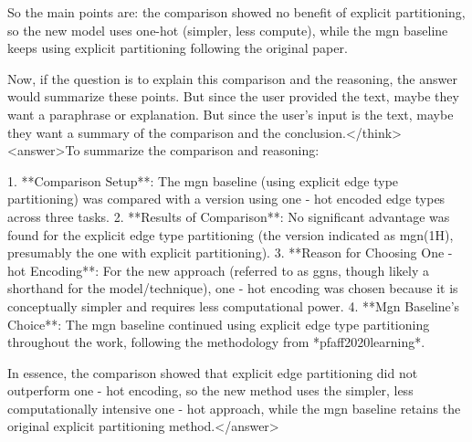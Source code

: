 So the main points are: the comparison showed no benefit of explicit partitioning, so the new model uses one-hot (simpler, less compute), while the mgn baseline keeps using explicit partitioning following the original paper.

Now, if the question is to explain this comparison and the reasoning, the answer would summarize these points. But since the user provided the text, maybe they want a paraphrase or explanation. But since the user's input is the text, maybe they want a summary of the comparison and the conclusion.</think><answer>To summarize the comparison and reasoning:  

1. **Comparison Setup**: The mgn baseline (using explicit edge type partitioning) was compared with a version using one - hot encoded edge types across three tasks.  
2. **Results of Comparison**: No significant advantage was found for the explicit edge type partitioning (the version indicated as mgn(1H), presumably the one with explicit partitioning).  
3. **Reason for Choosing One - hot Encoding**: For the new approach (referred to as ggns, though likely a shorthand for the model/technique), one - hot encoding was chosen because it is conceptually simpler and requires less computational power.  
4. **Mgn Baseline’s Choice**: The mgn baseline continued using explicit edge type partitioning throughout the work, following the methodology from *pfaff2020learning*.  


In essence, the comparison showed that explicit edge partitioning did not outperform one - hot encoding, so the new method uses the simpler, less computationally intensive one - hot approach, while the mgn baseline retains the original explicit partitioning method.</answer>
